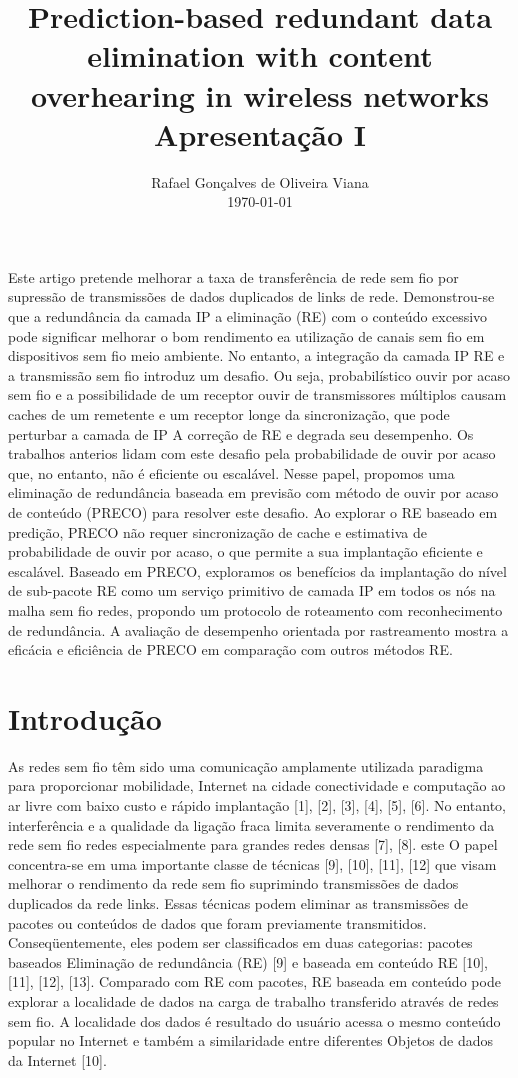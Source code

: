 \documentclass[12pt]{article}
\title{Prediction-based redundant data elimination with content overhearing in wireless networks  \\ Apresentação I}
\author{Rafael Gonçalves de Oliveira Viana\inst{1} \\\vspace*{10pt} \normalsize  \today{} }
\begin{document}
 

\maketitle

     
\begin{resumo} 	
	Este artigo pretende melhorar a taxa de transferência  de rede sem fio
    por supressão de transmissões de dados duplicados de
	links de rede. Demonstrou-se que a redundância da camada IP
	a eliminação (RE) com o conteúdo excessivo pode significar
	melhorar o bom rendimento ea utilização de canais sem fio em dispositivos sem fio
	meio ambiente. No entanto, a integração da camada IP RE e
	a transmissão sem fio introduz um desafio. Ou seja, probabilístico
	ouvir por acaso sem fio e a possibilidade de um receptor ouvir
	de transmissores múltiplos causam caches de um remetente e um
	receptor longe da sincronização, que pode perturbar a camada de IP
	A correção de RE e degrada seu desempenho.
	Os trabalhos anterios lidam com este desafio pela probabilidade de ouvir por acaso
	que, no entanto, não é eficiente ou escalável.
	Nesse papel, propomos uma eliminação de redundância baseada em previsão com
	método de ouvir por acaso de conteúdo (PRECO) para resolver este desafio.
	Ao explorar o RE baseado em predição, PRECO não requer
	sincronização de cache e estimativa de probabilidade de ouvir por acaso,
	o que permite a sua implantação eficiente e escalável. Baseado em
	PRECO, exploramos os benefícios da implantação do nível de sub-pacote
	RE como um serviço primitivo de camada IP em todos os nós na malha sem fio
	redes, propondo um protocolo de roteamento com reconhecimento de redundância.
	A avaliação de desempenho orientada por rastreamento mostra a eficácia e
	eficiência de PRECO em comparação com outros métodos RE.
\end{resumo}
\section{Introdução}

As redes sem fio têm sido uma comunicação amplamente utilizada
paradigma para proporcionar mobilidade, Internet na cidade
conectividade e computação ao ar livre com baixo custo e rápido
implantação [1], [2], [3], [4], [5], [6]. No entanto, interferência
e a qualidade da ligação fraca limita severamente o rendimento da rede sem fio
redes especialmente para grandes redes densas [7], [8]. este
O papel concentra-se em uma importante classe de técnicas [9], [10],
[11], [12] que visam melhorar o rendimento da rede sem fio
suprimindo transmissões de dados duplicados da rede
links. Essas técnicas podem eliminar as transmissões de
pacotes ou conteúdos de dados que foram previamente transmitidos.
Conseqüentemente, eles podem ser classificados em duas categorias: pacotes baseados
Eliminação de redundância (RE) [9] e baseada em conteúdo
RE [10], [11], [12], [13]. Comparado com RE com pacotes,
RE baseada em conteúdo pode explorar a localidade de dados na carga de trabalho
transferido através de redes sem fio. A localidade dos dados é resultado
do usuário acessa o mesmo conteúdo popular no
Internet e também a similaridade entre diferentes
Objetos de dados da Internet [10].
\end{document}
